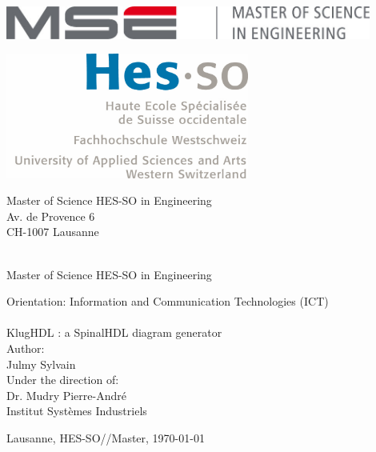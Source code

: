 \documentclass[a4paper,11pt]{report}
\begin{document}
  \begin{titlepage}
	\begin{flushright}
		\begin{minipage}{0.5\textwidth}
			\begin{flushleft}
				\includegraphics[width=0.9\textwidth]{img/mse_logo}
			\end{flushleft}
		\end{minipage}%
		\begin{minipage}{0.5\textwidth}
			\begin{flushright}
				\includegraphics[width=0.6\textwidth]{img/logo_hes-so}
			\end{flushright}
		\end{minipage}
		\begin{flushleft}
			\footnotesize
			Master of Science HES-SO in Engineering \\
			Av. de Provence 6 \\
			CH-1007 Lausanne
		\end{flushleft}
		~\\[0.5cm]
		
		{
		\Huge Master of Science HES-SO in Engineering\\[0.5cm]
		}
		
		{
		\LARGE Orientation: Information and Communication Technologies (ICT)\\[0.5cm]
		~\\[1cm]
		}
		{
			\Huge
			KlugHDL : a SpinalHDL diagram generator \\[1.5cm]
		}
		{
			\large
			Author:\\[-0.3cm]
			\Huge Julmy Sylvain \\[0.8cm]
		}
		{
			\large
			Under the direction of: \\
			Dr. Mudry Pierre-André \\
			Institut Systèmes Industriels \\[0.5cm]
		}
		\vfill
		
		{\large Lausanne, HES-SO//Master, \today}
		
	\end{flushright}
\end{titlepage}
\end{document}
